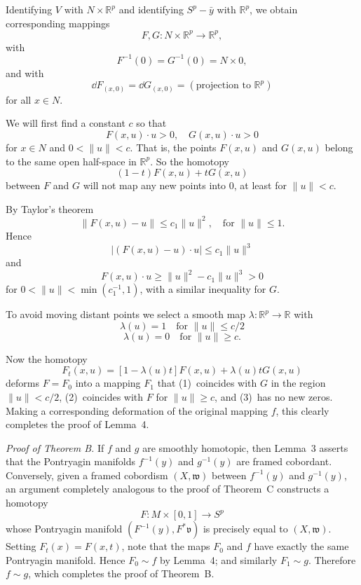 
Identifying $V$ with $N \times \mathbb{R}^p$ and identifying $S^p - \bar{y}$ with $\mathbb{R}^p$, we obtain corresponding mappings
\[
F, G : N \times \mathbb{R}^p \to \mathbb{R}^p,
\]
with
\[
F^{-1}(0) = G^{-1}(0) = N \times 0,
\]
and with
\[
\dd F_{(x, 0)} = \dd G_{(x, 0)} = (\text{projection to } \mathbb{R}^p)
\]
for all $x \in N$.

We will first find a constant $c$ so that
\[
F(x, u) \cdot u > 0, \quad G(x, u) \cdot u > 0
\]
for $x \in N$ and $0 < \|u\| < c$. That is, the points $F(x, u)$ and $G(x, u)$ belong to the same open half-space in $\mathbb{R}^p$. So the homotopy
\[
(1 - t) F(x, u) + t G(x, u)
\]
between $F$ and $G$ will not map any new points into $0$, at least for $\|u\| < c$.

By Taylor's theorem
\[
\|F(x, u) - u\| \le c_1 \|u\|^2, \quad \text{for } \|u\| \le 1.
\]
Hence
\[
|(F(x, u) - u) \cdot u| \le c_1 \|u\|^3
\]
and
\[
F(x, u) \cdot u \ge \|u\|^2 - c_1 \|u\|^3 > 0
\]
for $0 < \|u\| < \min(c_1^{-1}, 1)$, with a similar inequality for $G$.

To avoid moving distant points we select a smooth map $\lambda : \mathbb{R}^p \to \mathbb{R}$ with
\[
\lambda(u) = 1 \quad \text{for } \|u\| \le c/2
\]
\[
\lambda(u) = 0 \quad \text{for } \|u\| \ge c.
\]

Now the homotopy
\[
F_t(x, u) = [1 - \lambda(u) t] F(x, u) + \lambda(u) t G(x, u)
\]
deforms $F = F_0$ into a mapping $F_1$ that (1)~coincides with $G$ in the region $\|u\| < c/2$, (2)~coincides with $F$ for $\|u\| \ge c$, and (3)~has no new zeros. Making a corresponding deformation of the original mapping $f$, this clearly completes the proof of Lemma~4.




\noindent\textit{Proof of Theorem B.}
If $f$ and $g$ are smoothly homotopic, then Lemma~3 asserts that the Pontryagin manifolds $f^{-1}(y)$ and $g^{-1}(y)$ are framed cobordant. Conversely, given a framed cobordism $(X, \mathfrak{w})$ between $f^{-1}(y)$ and $g^{-1}(y)$, an argument completely analogous to the proof of Theorem~C constructs a homotopy
\[
F : M \times [0, 1] \to S^p
\]
whose Pontryagin manifold $(F^{-1}(y), F^*\mathfrak{v})$ is precisely equal to $(X, \mathfrak{w})$. Setting $F_t(x) = F(x, t)$, note that the maps $F_0$ and $f$ have exactly the same Pontryagin manifold. Hence $F_0 \sim f$ by Lemma~4; and similarly $F_1 \sim g$. Therefore $f \sim g$, which completes the proof of Theorem~B.

